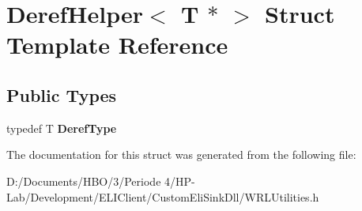 \hypertarget{struct_deref_helper_3_01_t_01_5_01_4}{}\section{Deref\+Helper$<$ T $\ast$ $>$ Struct Template Reference}
\label{struct_deref_helper_3_01_t_01_5_01_4}
\subsection*{Public Types}
\begin{DoxyCompactItemize}
\item 
\mbox{\label{struct_deref_helper_3_01_t_01_5_01_4_aeceb6afdba19ba2ab524b9e5894b7327}} 
typedef T {\bfseries Deref\+Type}
\end{DoxyCompactItemize}


The documentation for this struct was generated from the following file\+:\begin{DoxyCompactItemize}
\item 
D\+:/\+Documents/\+H\+B\+O/3/\+Periode 4/\+H\+P-\/\+Lab/\+Development/\+E\+L\+I\+Client/\+Custom\+Eli\+Sink\+Dll/W\+R\+L\+Utilities.\+h\end{DoxyCompactItemize}
